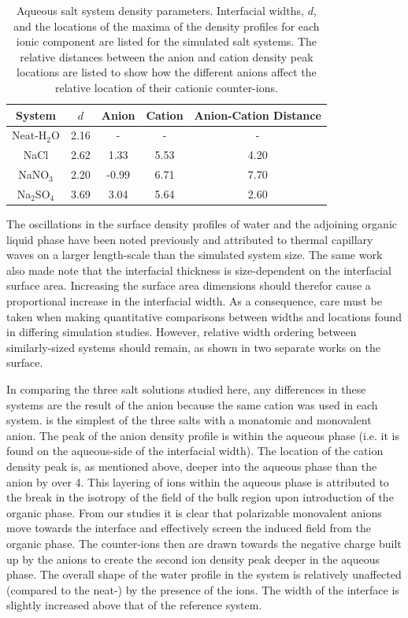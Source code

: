 \begin{table}[htdp]
	\begin{center}
	\begin{tabular}{|c||c|c|c|c|}
		\hline
		System & $d$ & Anion & Cation & Anion-Cation Distance \\ \hline
		Neat-H$_2$O & 2.16 & - & - & - \\ 
		NaCl & 2.62 & 1.33 & 5.53 & 4.20 \\
		NaNO$_3$ & 2.20 & -0.99 & 6.71 & 7.70 \\
		Na$_2$SO$_4$ & 3.69 & 3.04 & 5.64 & 2.60 \\
		\hline
	\end{tabular}
	\end{center}
	\caption{Aqueous salt system density parameters. Interfacial widths, $d$, and the locations of the maxima of the density profiles for each ionic component are listed for the simulated salt systems. The relative distances between the anion and cation density peak locations are listed to show how the different anions affect the relative location of their cationic counter-ions.}
	\label{table:double-layer}
\end{table}

The oscillations in the surface density profiles of water and the adjoining organic \ctc liquid phase have been noted previously and attributed to thermal capillary waves on a larger length-scale than the simulated system size.\cite{Chang1996} The same work also made note that the interfacial thickness is size-dependent on the interfacial surface area. Increasing the surface area dimensions should therefor cause a proportional increase in the interfacial width. As a consequence, care must be taken when making quantitative comparisons between widths and locations found in differing simulation studies. However, relative width ordering between similarly-sized systems should remain, as shown in two separate works on the \ctcwat surface.\cite{Chang1996,Hore2008}

In comparing the three salt solutions studied here, any differences in these systems are the result of the anion because the same cation was used in each system. \nacl is the simplest of the three salts with a monatomic and monovalent anion. The peak of the anion density profile is within the aqueous phase (i.e. it is found on the aqueous-side of the interfacial width). The location of the cation density peak is, as mentioned above, deeper into the aqueous phase than the anion by over 4\angs. This layering of ions within the aqueous phase is attributed to the break in the isotropy of the field of the bulk region upon introduction of the organic phase. From our studies it is clear that polarizable monovalent anions move towards the interface and effectively screen the induced field from the organic phase. The counter-ions then are drawn towards the negative charge built up by the anions to create the second ion density peak deeper in the aqueous phase. The overall shape of the water profile in the \nacl system is relatively unaffected (compared to the neat-\ctcwat) by the presence of the ions. The width of the interface is slightly increased above that of the reference system.

